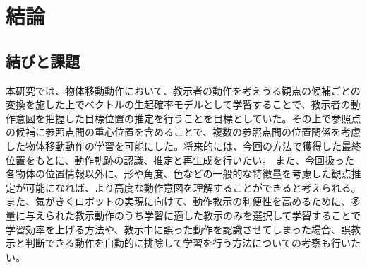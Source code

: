 ﻿%
\chapter{結論}

\section{結びと課題}

本研究では、物体移動動作において、教示者の動作を考えうる観点の候補ごとの変換を施した上でベクトルの生起確率モデルとして学習することで、教示者の動作意図を把握した目標位置の推定を行うことを目標としていた。その上で参照点の候補に参照点間の重心位置を含めることで、複数の参照点間の位置関係を考慮した物体移動動作の学習を可能にした。将来的には、今回の方法で獲得した最終位置をもとに、動作軌跡の認識、推定と再生成を行いたい。
また、今回扱った各物体の位置情報以外に、形や角度、色などの一般的な特徴量を考慮した観点推定が可能になれば、より高度な動作意図を理解することができると考えられる。
また、気がきくロボットの実現に向けて、動作教示の利便性を高めるために、多量に与えられた教示動作のうち学習に適した教示のみを選択して学習することで学習効率を上げる方法や、教示中に誤った動作を認識させてしまった場合、誤教示と判断できる動作を自動的に排除して学習を行う方法についての考察も行いたい。

